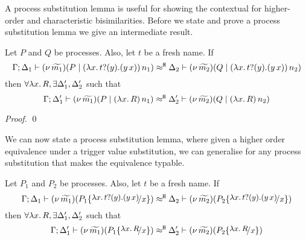 
A process substitution lemma is useful for showing the
contextual for higher-order and characteristic bisimilarities.
Before we state and prove a process substitution lemma
we give an intermediate result.

\newcommand{\trval}[2]{\abs{x}{\binp{#1}{y} (\appl{y}{#2})}}
\newcommand{\trvalx}[1]{\trval{#1}{x}}

\begin{lemma}
	\label{lem:tigger_subst}
	Let $P$ and $Q$ be processes. Also, let $t$ be a fresh name. If
	\[
		\horel{\Gamma}{\Delta_1}{\newsp{\widetilde{m_1}}{P \Par \appl{(\trvalx{t})}{n_1} }}
		{\hwb}
		{\Delta_2}{\newsp{\widetilde{m_2}}{Q \Par \appl{(\trvalx{t})}{n_2} }}
	\]
	then $\forall \lambda x.\,R, \exists \Delta_1', \Delta_2'$ such that
	\[
		\Gamma; \Delta_1' \vdash (\nu\, \widetilde{m_1})(P \;|\; (\lambda x.\,R)\, {n_1} ) \approx^\mathtt{H} \Delta_2' \vdash (\nu\, \widetilde{m_2})(Q \;|\; (\lambda x.\,R)\, {n_2} )
	\]
\end{lemma}

\begin{proof}
	\qed
\end{proof}



We can now state a process substitution lemma, where given
a higher order equivalence under a trigger value substitution,
we can generalise for any process substitution that makes
the equivalence typable.

\begin{lemma}
	Let $P_1$ and $P_2$ be processes. Also, let $t$ be a fresh name. 
	If
	\[
		\horel{\Gamma}{\Delta_1}{\newsp{\widetilde{m_1}}{P_1 \subst{\trvalx{t}}{x} }}
		{\hwb}
		{\Delta_2}{\newsp{\widetilde{m_2}}{P_2 \subst{\trvalx{t}}{x} }}
	\]
	then $\forall \lambda x.\,R, \exists \Delta_1', \Delta_2'$ such that
	\[
		\horel{\Gamma}{\Delta_1'}{\newsp{\widetilde{m_1}}{P_1 \subst{{\abs{x}{R}}}{x} }}
		{\hwb}
		{\Delta_2'}{\newsp{\widetilde{m_2}}{P_2 \subst{{\abs{x}{R}}}{x} }}
	\]
\end{lemma}



